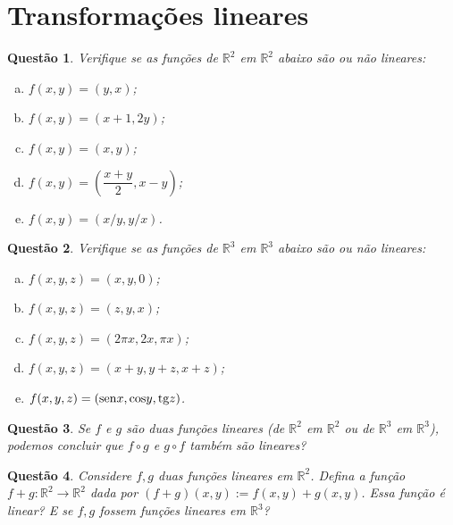 \documentclass[a4paper,12pt]{article}
\author{Lista de Exercícios - GAAL}
\date{Segunda Prova}
\title{}
\def\R{\mathbb R}
\newtheorem{qst}{Questão}[section]
\begin{document}
\maketitle

\section{Transformações lineares}

\begin{qst}
	Verifique se as funções de $\R^2$ em $\R^2$ abaixo são ou não lineares:
	\begin{enumerate}[a)]
		\item $f(x,y)=(y,x)$;
		\item $f(x,y)=(x+1,2y)$;
		\item $f(x,y)=(x,y)$;
		\item $f(x,y)=\left(\dfrac{x+y}{2},x-y\right)$;
		\item $f(x,y)=(x/y,y/x)$.
	\end{enumerate}
\end{qst}

\begin{qst}
	Verifique se as funções de $\R^3$ em $\R^3$ abaixo são ou não lineares:
	\begin{enumerate}[a)]
		\item $f(x,y,z)=(x,y,0)$;
		\item $f(x,y,z)=(z,y,x)$;
		\item $f(x,y,z)=(2\pi x,2x,\pi x)$;
		\item $f(x,y,z)=(x+y,y+z,x+z)$;
		\item $f(x,y,z)=({\rm sen} x, {\rm cos} y, {\rm tg} z)$.
	\end{enumerate}
\end{qst}

\begin{qst}
	Se $f$ e $g$ são duas funções lineares (de $\R^2$ em $\R^2$ ou de $\R^3$ em $\R^3$), podemos concluir que $f\circ g$ e $g\circ f$ também são lineares?
\end{qst}
\begin{qst}
	Considere $f,g$ duas funções lineares em $\R^2$. Defina a função $f+g:\R^2\to \R^2$ dada por $(f+g)(x,y):=f(x,y)+g(x,y)$. Essa função é linear? E se $f,g$ fossem funções lineares em $\R^3$?
\end{qst}
\pagebreak
\end{document}
